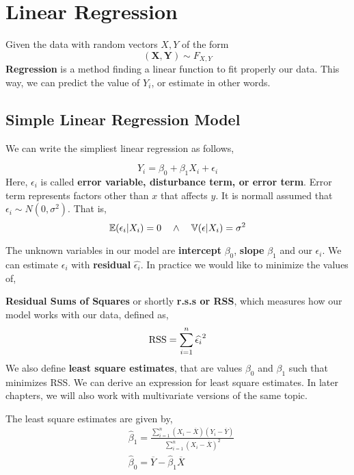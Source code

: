 \chapter{Linear Regression}
Given the data with random vectors $X,Y$ of the form
\[ (\mathbf{X}, \mathbf{Y}) \sim F_{X,Y}\]
\textbf{Regression} is a method finding a linear function to fit properly our data. This way, we can predict the value of $Y_i$, or estimate in other words.
\section{Simple Linear Regression Model}
\begin{definition}
We can write the simpliest linear regression as follows,

\[Y_i = \beta_0 + \beta_1X_i + \epsilon_i \]
Here, $\epsilon_i$ is called \textbf{error variable, disturbance term, or error term}. 
Error term represents factors other than $x$ that affects $y$.
It is normall assumed  that $\epsilon_i \sim N(0, \sigma^2)$. That is,
\[ {\mathbb{E}}(\epsilon_i | X_i) = 0 \quad \land \quad {\mathbb{V}}(\epsilon | X_i) = \sigma^2 \]
\end{definition}

The unknown variables in our model are \textbf{intercept} $\beta_0$, \textbf{slope} $\beta_1$ and our $\epsilon_i$. We can estimate $\epsilon_i$ with \textbf{residual} $\widehat{\epsilon_i}$. 
In practice we would like to minimize the values of,
\begin{definition}
    \textbf{Residual Sums of Squares} or shortly \textbf{r.s.s or RSS},
    which measures how our model works with our data, defined as,
    \[\operatorname{RSS} = \sum_{i=1}^n \widehat{\epsilon_i}^2 \]
We also define \textbf{least square estimates}, that are values 
$\beta_0$ and $\beta_1$ such that minimizes RSS.
We can derive an expression for least square estimates. In later chapters, we will also work with multivariate versions of the same topic.
\begin{theorem}
    The least square estimates are given by,
    \begin{align*} &\widehat{\beta}_1 = \frac{\sum_{i = 1}^n(X_i - \overline{X})(Y_i - \overline{Y})}{\sum_{i = 1}^n (X_i - \overline{X})^2} \\
        &\widehat{\beta}_0 = \overline{Y} - \widehat{\beta}_1\overline{X}
\end{align*}
    
\end{theorem}
\end{definition}
